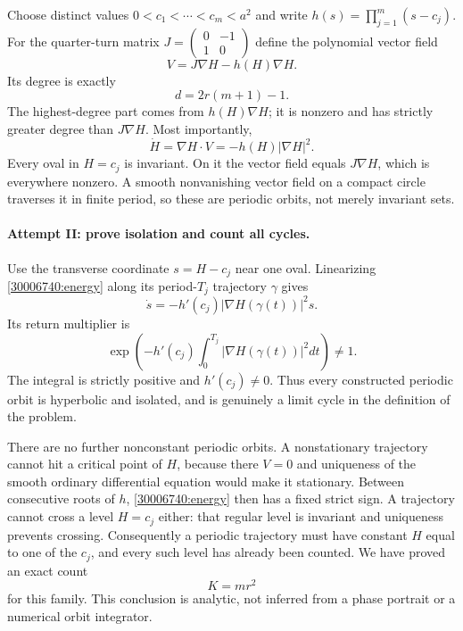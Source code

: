 \documentclass[11pt,a4paper]{article}
\numberwithin{equation}{section}
\begin{document}
Choose distinct values $0<c_1<\cdots<c_m<a^2$ and write
$h(s)=\prod_{j=1}^m(s-c_j)$.  For the quarter-turn matrix
$J=\begin{pmatrix}0&-1\\1&0\end{pmatrix}$ define the polynomial vector
field
\begin{equation}\label{30006740:field}
 V=J\nabla H-h(H)\nabla H.
\end{equation}
Its degree is exactly
\begin{equation}\label{30006740:degree}
 d=2r(m+1)-1.
\end{equation}
The highest-degree part comes from $h(H)\nabla H$; it is nonzero and
has strictly greater degree than $J\nabla H$.
Most importantly,
\begin{equation}\label{30006740:energy}
 \dot H=\nabla H\cdot V=-h(H)|\nabla H|^2.
\end{equation}
Every oval in $H=c_j$ is invariant.  On it the vector field equals
$J\nabla H$, which is everywhere nonzero.  A smooth nonvanishing
vector field on a compact circle traverses it in finite period,
so these are periodic orbits, not merely invariant sets.

\paragraph{Attempt II: prove isolation and count all cycles.}
Use the transverse coordinate $s=H-c_j$ near one oval.  Linearizing
\eqref{30006740:energy} along its period-$T_j$ trajectory $\gamma$ gives
\[
 \dot s=-h'(c_j)|\nabla H(\gamma(t))|^2s.
\]
Its return multiplier is
\begin{equation}\label{30006740:multiplier}
 \exp\!\left(-h'(c_j)\int_0^{T_j}
                      |\nabla H(\gamma(t))|^2dt\right)\ne1.
\end{equation}
The integral is strictly positive and $h'(c_j)\ne0$.  Thus every
constructed periodic orbit is hyperbolic and isolated, and is genuinely
a limit cycle in the definition of the problem.

There are no further nonconstant periodic orbits.  A nonstationary
trajectory cannot hit a critical point of $H$, because there $V=0$
and uniqueness of the smooth ordinary differential equation would make
it stationary.  Between consecutive roots of $h$, \eqref{30006740:energy}
then has a fixed strict sign.  A trajectory cannot cross a level
$H=c_j$ either: that regular level is invariant and uniqueness prevents
crossing.  Consequently a periodic trajectory must have constant $H$
equal to one of the $c_j$, and every such level has already been counted.
We have proved an exact count
\begin{equation}\label{30006740:count}
 K=mr^2
\end{equation}
for this family.  This conclusion is analytic, not inferred from a phase
portrait or a numerical orbit integrator.
\end{document}
